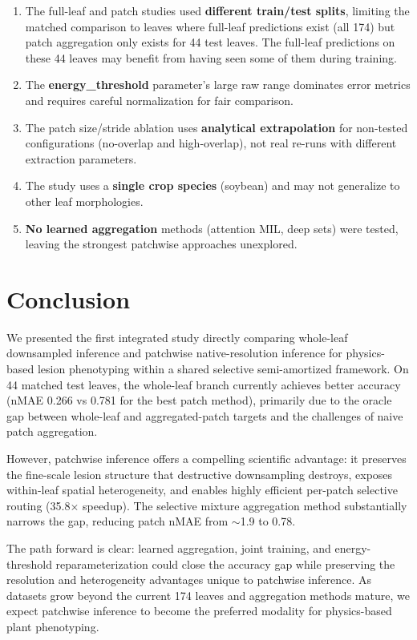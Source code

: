 \documentclass[11pt]{article}
\begin{document}
\begin{enumerate}[leftmargin=1.5em,itemsep=1pt]
\item The full-leaf and patch studies used \textbf{different train/test splits}, limiting the matched comparison to leaves where full-leaf predictions exist (all 174) but patch aggregation only exists for 44 test leaves.  The full-leaf predictions on these 44 leaves may benefit from having seen some of them during training.
\item The \textbf{energy\_threshold} parameter's large raw range dominates error metrics and requires careful normalization for fair comparison.
\item The patch size/stride ablation uses \textbf{analytical extrapolation} for non-tested configurations (no-overlap and high-overlap), not real re-runs with different extraction parameters.
\item The study uses a \textbf{single crop species} (soybean) and may not generalize to other leaf morphologies.
\item \textbf{No learned aggregation} methods (attention MIL, deep sets) were tested, leaving the strongest patchwise approaches unexplored.
\end{enumerate}


\section{Conclusion}
\label{sec:conclusion}

We presented the first integrated study directly comparing whole-leaf downsampled inference and patchwise native-resolution inference for physics-based lesion phenotyping within a shared selective semi-amortized framework.  On 44 matched test leaves, the whole-leaf branch currently achieves better accuracy (nMAE 0.266 vs 0.781 for the best patch method), primarily due to the oracle gap between whole-leaf and aggregated-patch targets and the challenges of naive patch aggregation.

However, patchwise inference offers a compelling scientific advantage: it preserves the fine-scale lesion structure that destructive downsampling destroys, exposes within-leaf spatial heterogeneity, and enables highly efficient per-patch selective routing (35.8$\times$ speedup).  The selective mixture aggregation method substantially narrows the gap, reducing patch nMAE from $\sim$1.9 to 0.78.

The path forward is clear: learned aggregation, joint training, and energy-threshold reparameterization could close the accuracy gap while preserving the resolution and heterogeneity advantages unique to patchwise inference.  As datasets grow beyond the current 174 leaves and aggregation methods mature, we expect patchwise inference to become the preferred modality for physics-based plant phenotyping.
\end{document}
